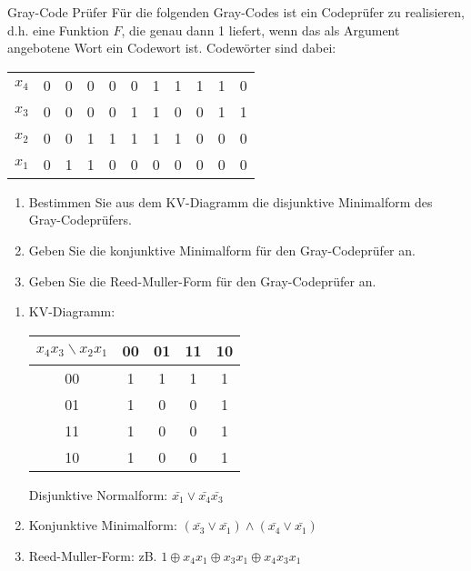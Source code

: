 \documentclass{article}
\begin{document}
\begin{exercise}{Gray-Code Prüfer}
  Für die folgenden Gray-Codes ist ein Codeprüfer zu realisieren, d.h. eine Funktion $F$, die genau dann 1 liefert, wenn das als Argument angebotene Wort ein Codewort ist. Codewörter sind dabei:\par
  \begin{tabular}{c|cccc cccc cc}
    $x_4$ & 0 & 0 & 0 & 0 & 0 & 1 & 1 & 1 & 1 & 0 \\
    $x_3$ & 0 & 0 & 0 & 0 & 1 & 1 & 0 & 0 & 1 & 1 \\
    $x_2$ & 0 & 0 & 1 & 1 & 1 & 1 & 1 & 0 & 0 & 0 \\
    $x_1$ & 0 & 1 & 1 & 0 & 0 & 0 & 0 & 0 & 0 & 0 \\
  \end{tabular}
  \begin{enumerate}
    \item Bestimmen Sie aus dem KV-Diagramm die disjunktive Minimalform des Gray-Codeprüfers.\points[5]
    \item Geben Sie die konjunktive Minimalform für den Gray-Codeprüfer an.\points[3]
    \item Geben Sie die Reed-Muller-Form für den Gray-Codeprüfer an.\points[3]\par
  \end{enumerate}
\end{exercise}

\begin{solution}
  \begin{enumerate}
    \item KV-Diagramm:
          \begin{tabular}{c|cccc}
            $x_4x_3\backslash x_2x_1$ & 00 & 01 & 11 & 10 \\
            \hline
            00                        & 1  & 1  & 1  & 1  \\
            01                        & 1  & 0  & 0  & 1  \\
            11                        & 1  & 0  & 0  & 1  \\
            10                        & 1  & 0  & 0  & 1  \\
          \end{tabular}\par
          Disjunktive Normalform: $\bar{x_1}\lor\bar{x_4}\bar{x_3}$
    \item Konjunktive Minimalform: $(\bar{x_3}\lor\bar{x_1})\land(\bar{x_4}\lor\bar{x_1})$
    \item Reed-Muller-Form: zB. $1\oplus x_4x_1\oplus x_3x_1\oplus x_4x_3x_1$
  \end{enumerate}
\end{solution}
\end{document}
